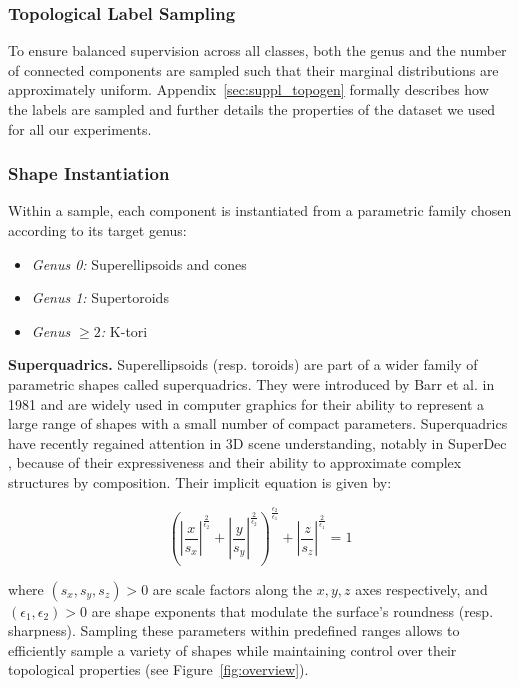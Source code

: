 \subsubsection{Topological Label Sampling}
\label{sssec:labels-distribution}

To ensure balanced supervision across all classes, both the genus and the number of connected components are sampled such that their marginal distributions are approximately uniform. Appendix~\ref{sec:suppl_topogen} formally describes how the labels are sampled and further details the properties of the dataset we used for all our experiments.

\subsubsection{Shape Instantiation}
\label{sssec:sample-level-properties}

Within a sample, each component is instantiated from a parametric family chosen according to its target genus:
\begin{itemize}
  \item \textit{Genus 0:} Superellipsoids and cones
  \item \textit{Genus 1:} Supertoroids
  \item \textit{Genus $\geq 2$:} K-tori
\end{itemize}

\textbf{Superquadrics.} Superellipsoids  (resp. toroids) are part of a wider family of parametric shapes called superquadrics. They were introduced by Barr et al. \cite{superquadrics} in 1981 and are widely used in computer graphics for their ability to represent a large range of shapes with a small number of compact parameters. Superquadrics have recently regained attention in 3D scene understanding, notably in SuperDec \cite{superdec}, because of their expressiveness and their ability to approximate complex structures by composition. Their implicit equation is given by:

\begin{equation}
\left( \left| \frac{x}{s_x} \right|^{\tfrac{2}{\epsilon_2}}
     + \left| \frac{y}{s_y} \right|^{\tfrac{2}{\epsilon_2}} \right)^{\tfrac{\epsilon_2}{\epsilon_1}}
+ \left| \frac{z}{s_z} \right|^{\tfrac{2}{\epsilon_1}}
= 1
\end{equation}

where $(s_x, s_y, s_z) > 0$ are scale factors along the $x, y, z$ axes respectively, and $(\epsilon_1, \epsilon_2) > 0$ are shape exponents that modulate the surface's roundness (resp. sharpness). Sampling these parameters within predefined ranges allows to efficiently sample a variety of shapes while maintaining control over their topological properties (see Figure~\ref{fig:overview}).

